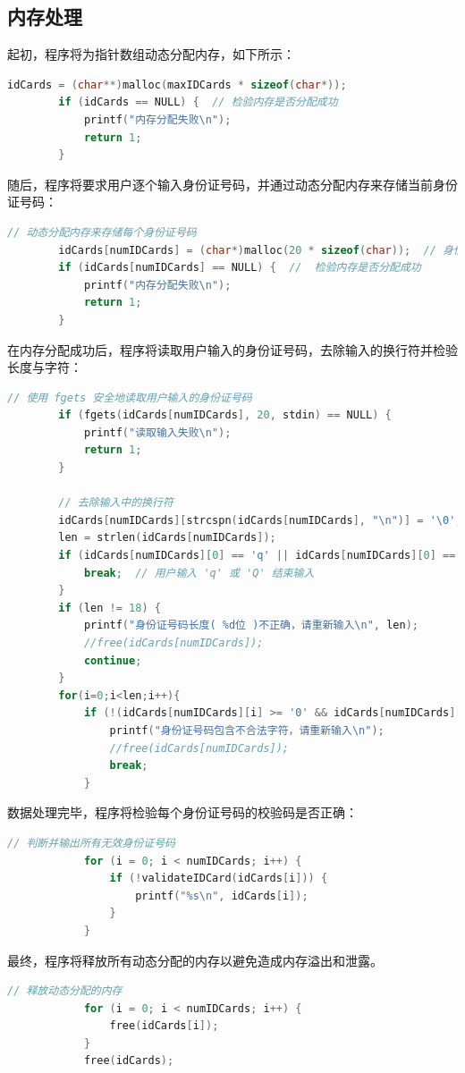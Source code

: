 \documentclass[withoutpreface,bwprint]{cumcmthesis}  %
\begin{document}
	\subsection{内存处理}
	
	起初，程序将为指针数组动态分配内存，如下所示：
	\begin{lstlisting}[language=c]
		idCards = (char**)malloc(maxIDCards * sizeof(char*));
		if (idCards == NULL) {  // 检验内存是否分配成功
			printf("内存分配失败\n");
			return 1;
		}
	\end{lstlisting}
	
	随后，程序将要求用户逐个输入身份证号码，并通过动态分配内存来存储当前身份证号码：
	\begin{lstlisting}[language=c]
		// 动态分配内存来存储每个身份证号码
		idCards[numIDCards] = (char*)malloc(20 * sizeof(char));  // 身份证号码长度为18位，最后一位为'\0'
		if (idCards[numIDCards] == NULL) {  //  检验内存是否分配成功
			printf("内存分配失败\n");
			return 1;
		}
	\end{lstlisting}	
	
	在内存分配成功后，程序将读取用户输入的身份证号码，去除输入的换行符并检验长度与字符：
	\begin{lstlisting}[language=c]
		// 使用 fgets 安全地读取用户输入的身份证号码
		if (fgets(idCards[numIDCards], 20, stdin) == NULL) {
			printf("读取输入失败\n");
			return 1;
		}
		
		// 去除输入中的换行符
		idCards[numIDCards][strcspn(idCards[numIDCards], "\n")] = '\0';
		len = strlen(idCards[numIDCards]);
		if (idCards[numIDCards][0] == 'q' || idCards[numIDCards][0] == 'Q') {
			break;  // 用户输入 'q' 或 'Q' 结束输入
		}
		if (len != 18) {
			printf("身份证号码长度( %d位 )不正确，请重新输入\n", len);
			//free(idCards[numIDCards]);
			continue;
		}
		for(i=0;i<len;i++){
			if (!(idCards[numIDCards][i] >= '0' && idCards[numIDCards][i] <='9' || idCards[numIDCards][i] == 'X')) {
				printf("身份证号码包含不合法字符，请重新输入\n");
				//free(idCards[numIDCards]);
				break;
			}
		\end{lstlisting}	
		
		数据处理完毕，程序将检验每个身份证号码的校验码是否正确：
		\begin{lstlisting}[language=c]
			// 判断并输出所有无效身份证号码
			for (i = 0; i < numIDCards; i++) {
				if (!validateIDCard(idCards[i])) {
					printf("%s\n", idCards[i]);
				}
			}
		\end{lstlisting}
		
		最终，程序将释放所有动态分配的内存以避免造成内存溢出和泄露。	
		\begin{lstlisting}[language=c]
			// 释放动态分配的内存
			for (i = 0; i < numIDCards; i++) {
				free(idCards[i]);
			}
			free(idCards);
		\end{lstlisting}
		
\end{document}
